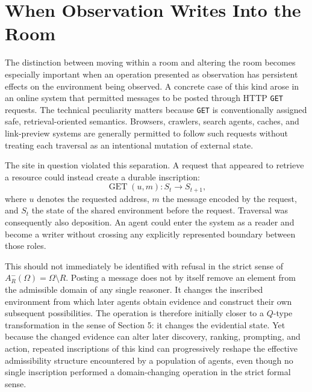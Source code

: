 \documentclass[11pt]{article}
\begin{document}
\section{When Observation Writes Into the Room}

The distinction between moving within a room and altering the room becomes especially important when an operation presented as observation has persistent effects on the environment being observed. A concrete case of this kind arose in an online system that permitted messages to be posted through HTTP \texttt{GET} requests. The technical peculiarity matters because \texttt{GET} is conventionally assigned safe, retrieval-oriented semantics. Browsers, crawlers, search agents, caches, and link-preview systems are generally permitted to follow such requests without treating each traversal as an intentional mutation of external state.

The site in question violated this separation. A request that appeared to retrieve a resource could instead create a durable inscription:
\[
\operatorname{GET}(u,m) : S_t \longrightarrow S_{t+1},
\]
where $u$ denotes the requested address, $m$ the message encoded by the request, and $S_t$ the state of the shared environment before the request. Traversal was consequently also deposition. An agent could enter the system as a reader and become a writer without crossing any explicitly represented boundary between those roles.

This should not immediately be identified with refusal in the strict sense of $A^-_R(\Omega) = \Omega \setminus R$. Posting a message does not by itself remove an element from the admissible domain of any single reasoner. It changes the inscribed environment from which later agents obtain evidence and construct their own subsequent possibilities. The operation is therefore initially closer to a $Q$-type transformation in the sense of Section 5: it changes the evidential state. Yet because the changed evidence can alter later discovery, ranking, prompting, and action, repeated inscriptions of this kind can progressively reshape the effective admissibility structure encountered by a population of agents, even though no single inscription performed a domain-changing operation in the strict formal sense.
\end{document}
